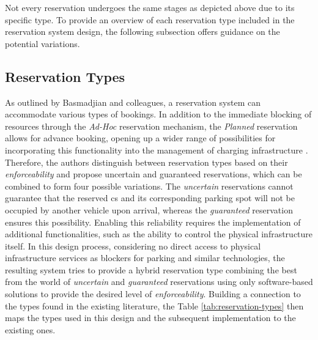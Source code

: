 \noindent Not every reservation undergoes the same stages as depicted above due to its specific type. To provide an overview of each reservation type included in the reservation system design, the following subsection offers guidance on the potential variations.

\newpage

\subsection{Reservation Types}
\label{ch:Design:sec:Reservation:ssec:Reservation Types}

As outlined by Basmadjian and colleagues, a reservation system can accommodate various types of bookings. In addition to the immediate blocking of resources through the \textit{Ad-Hoc} reservation mechanism, the \textit{Planned} reservation allows for advance booking, opening up a wider range of possibilities for incorporating this functionality into the management of charging infrastructure \cite{basmadjian_interoperable_2019,basmadjian_reference_2020}.
Therefore, the authors distinguish between reservation types based on their \textit{enforceability} and propose uncertain and guaranteed reservations, which can be combined to form four possible variations.
The \textit{uncertain} reservations cannot guarantee that the reserved \acrshort{cs} and its corresponding parking spot will not be occupied by another vehicle upon arrival, whereas the \textit{guaranteed} reservation ensures this possibility.
Enabling this reliability requires the implementation of additional functionalities, such as the ability to control the physical infrastructure itself.
In this design process, considering no direct access to physical infrastructure services as blockers for parking and similar technologies, the resulting system tries to provide a hybrid reservation type combining the best from the world of \textit{uncertain} and \textit{guaranteed} reservations using only software-based solutions to provide the desired level of \textit{enforceability}.
Building a connection to the types found in the existing literature, the Table \ref{tab:reservation-types} then maps the types used in this design and the subsequent implementation to the existing ones.

